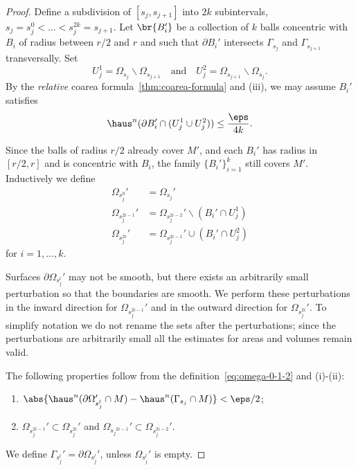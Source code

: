 \begin{lemma}
\begin{proof}
        Define a subdivision of $[s_j, s_{j + 1}]$ into $2k$ subintervals, $s_j = s_j^0 < \dots < s_j^{2k} = s_{j + 1}$. Let $\br{B_i'}$ be a collection of $k$ balls concentric with $B_i$ of radius between $r/2$ and $r$ and such that $\partial B_i'$ intersects $\Gamma_{s_j}$ and $\Gamma_{s_{j + 1}}$ transversally. Set 
        \begin{equation*}
            U_j^1 = \Omega_{s_j}\backslash\Omega_{s_{j + 1}}\quad\text{and}\quad U_j^2 = \Omega_{s_{j + 1}}\backslash\Omega_{s_j}.
        \end{equation*}
        By the \emph{relative} coarea formula~\ref{thm:coarea-formula} and (iii), we may assume $B_i'$ satisfies
        \begin{equation}\label{eq:coarea-small-boundary-ball}
            \haus^n(\partial B_i'\cap (U_j^1\cup U_j^2)) \leq \frac{\eps}{4k}.
        \end{equation}

        Since the balls of radius $r/2$ already cover $M'$, and each $B_i'$ has radius in $[r/2,r]$ and is concentric with $B_i$, the family $\{B_i'\}_{i=1}^k$ still covers $M'$. Inductively we define
        \begin{equation}\label{eq:omega-0-1-2}
            \begin{split}
                \Omega_{s_j^0}' &= \Omega_{s_j}'\\
                \Omega_{s_j^{2i - 1}}' &= \Omega_{s_j^{2i - 2}}'\backslash (B_i'\cap U_j^1)\\
                \Omega_{s_j^{2i}}' &= \Omega_{s_j^{2i - 1}}'\cup(B_i'\cap U_j^2)
            \end{split}
        \end{equation}
        for $i = 1, \dots, k$.

        Surfaces $\partial\Omega_{s_j^l}'$ may not be smooth, but there exists an arbitrarily small perturbation so that the boundaries are smooth. We perform these perturbations in the inward direction for $\Omega_{s_j^{2i - 1}}'$ and in the outward direction for $\Omega_{s_j^{2i}}'$. To simplify notation we do not rename the sets after the perturbations; since the perturbations are arbitrarily small all the estimates for areas and volumes remain valid. 

        The following properties follow from the definition~\ref{eq:omega-0-1-2} and (i)-(ii):
        \begin{enumerate}
            \item[(a)] $\abs{\haus^n(\partial\Omega_{s_j^l}'\cap M) - \haus^n(\Gamma_{s_j}\cap M)} < \eps/2$; 
            \item[(b)] $\Omega_{s_j^{2i - 1}}' \subset \Omega_{s_j^{2i}}'$ and $\Omega_{{s_j}^{2i - 1}}' \subset \Omega_{{s_j^{2i - 2}}}'$.
        \end{enumerate}
        We define $\Gamma_{s_j^l}' = \partial\Omega_{s_j^l}'$, unless $\Omega_{s_j^l}'$ is empty. 


\end{proof}
\end{lemma}
